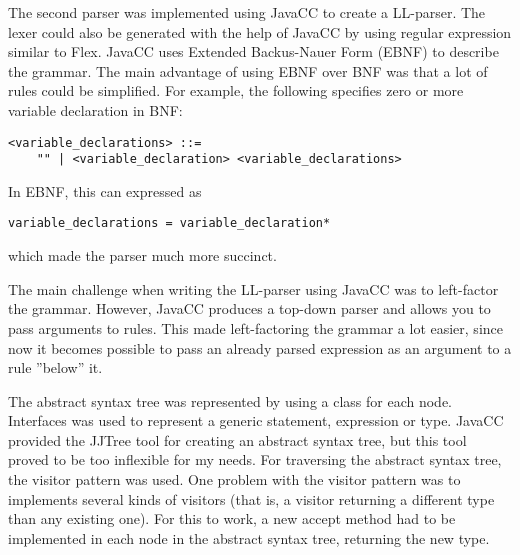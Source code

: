 \documentclass[11pt,oneside,a4paper]{article}
\begin{document}
The second parser was implemented using JavaCC to create a LL-parser. The lexer
could also be generated with the help of JavaCC by using regular expression
similar to Flex. JavaCC uses Extended Backus-Nauer Form (EBNF) to describe the
grammar. The main advantage of using EBNF over BNF was that a lot of rules
could be simplified. For example, the following specifies zero or more variable
declaration in BNF:
\begin{verbatim}
<variable_declarations> ::= 
    "" | <variable_declaration> <variable_declarations>
\end{verbatim}
In EBNF, this can expressed as 
\begin{verbatim}
variable_declarations = variable_declaration*
\end{verbatim} 
which made the parser much more succinct.

The main challenge when writing the LL-parser using JavaCC was to left-factor
the grammar. However, JavaCC produces a top-down parser and allows you to
pass arguments to rules. This made left-factoring the grammar  a lot easier, 
since now it becomes possible to pass an already parsed expression as an 
argument to a rule ''below'' it.

The abstract syntax tree was represented by using a class for each node.
Interfaces was used to represent a generic statement, expression or type.
JavaCC provided the JJTree tool for creating an abstract syntax tree, but this
tool proved to be too inflexible for my needs. For traversing the abstract
syntax tree, the visitor pattern was used. One problem with the visitor pattern
was to implements several kinds of visitors (that is, a visitor returning a
different type than any existing one). For this to work, a new accept method
had to be implemented in each node in the abstract syntax tree, returning the
new type.
\end{document}
